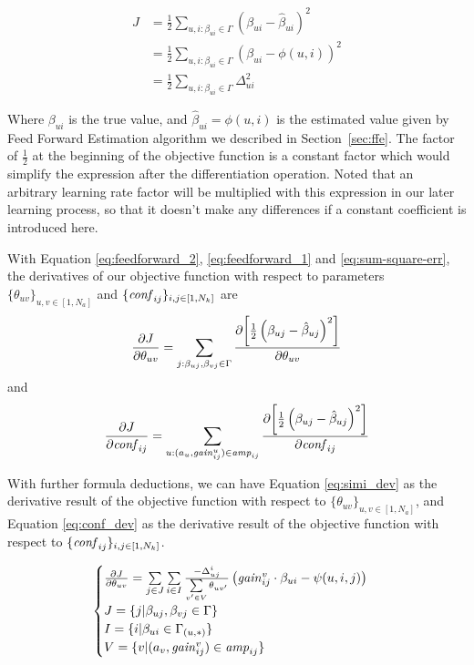 \documentclass[conference,compsoc]{IEEEtran}
\begin{document}
\begin{equation}
\label{eq:sum-square-err}
\begin{aligned}
J &= \frac{1}{2} \sum_{u,i:\beta_{ui}\in\Gamma} \left(\beta_{ui}-\hat{\beta}_{ui}\right)^2 \\
  &= \frac{1}{2} \sum_{u,i:\beta_{ui}\in\Gamma} \left(\beta_{ui}-\phi(u,i)\right)^2 \\
  &= \frac{1}{2} \sum_{u,i:\beta_{ui}\in\Gamma} \Delta^2_{ui}
\end{aligned}
\end{equation}

Where $\beta_{ui}$ is the true value, and
$\hat{\beta}_{ui}=\phi(u,i)$ is the estimated value given by Feed
Forward Estimation algorithm we described in Section~\ref{sec:ffe}. The factor of $\frac{1}{2}$ at the  beginning of the objective function is a constant factor which would simplify the expression after the differentiation operation. Noted that an arbitrary learning rate factor will be multiplied with this expression in our later learning process, so that it doesn't make any differences if a constant coefficient is introduced here.

With Equation \ref{eq:feedforward_2}, \ref{eq:feedforward_1} and \ref{eq:sum-square-err}, the derivatives of our objective function
with respect to parameters $\{\theta_{uv}\}_{u,v\in[1,N_a]}$ and $\{\mathit{conf}_{ij}\}_{i,j\in[1,N_k]}$ are
\[
\frac{\partial {J}}{\partial {\theta_{uv}}} = \sum_{j:\beta_{uj},\beta_{vj}\in\Gamma} \frac{\partial {\left[\frac{1}{2}\left(\beta_{uj}-\hat{\beta}_{uj}\right)^2\right]}}{\partial {\theta_{uv}}}
\]
and
\[
\frac{\partial {J}}{\partial {\mathit{conf}_{ij}}} = \sum_{u:(a_u,\mathit{gain}^{u}_{ij})\in\mathit{amp}_{ij}} \frac{\partial {\left[\frac{1}{2}\left(\beta_{uj}-\hat{\beta}_{uj}\right)^2\right]}}{\partial {\mathit{conf}_{ij}}}
\]

With further formula deductions, we can have Equation \ref{eq:simi_dev} as the derivative result of the objective function
with respect to $\{\theta_{uv}\}_{u,v\in[1,N_a]}$, and Equation \ref{eq:conf_dev} as the derivative result of the objective function with respect to $\{\mathit{conf}_{ij}\}_{i,j\in[1,N_k]}$.

\begin{equation}
\label{eq:simi_dev}
\begin{cases}
\pa{J}{\theta_{uv}}=\sum\limits_{j\in J} \sum\limits_{i\in I} \frac{-\Delta_{uj}^{i}}{\sum \limits_{v'\in V} \theta_{{u}{v'}}}  \left(\gain{v}{ij}\cdot\beta_{ui}- \psi(u,i,j)\right) \\
J=\{j|\beta_{uj},\beta_{vj}\in\Gamma\} \\
I=\{i|\beta_{ui}\in\Gamma_{(u,*)}\} \\
V=\{v|(a_{v},\gain{{v}}{ij})\in \amp{ij}\}
\end{cases}
\end{equation}
\end{document}
